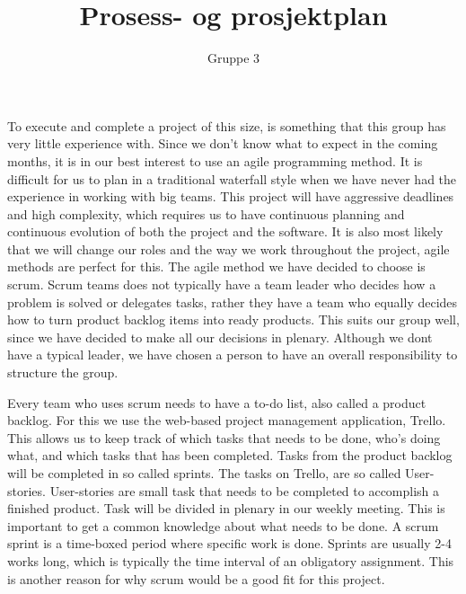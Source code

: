 \documentclass{article}
\begin{document}
\title{Prosess- og prosjektplan}
\author{Gruppe 3}

\maketitle


\raggedright

To execute and complete a project of this size, is something that this group has very little experience with. Since we don't know what to expect in the coming months, it is in our best interest to use an agile programming method. It is difficult for us to plan in a traditional waterfall style when we have never had the experience in working with big teams. This project will have aggressive deadlines and high complexity, which requires us to have continuous planning and continuous evolution of both the project and the software. It is also most likely that we will change our roles and the way we work throughout the project, agile methods are perfect for this. \newline
\newline
The agile method we have decided to choose is scrum. Scrum teams does not typically have a team leader who decides how a problem is solved or delegates tasks, rather they have a team who equally decides how to turn product backlog items into ready products. This suits our group well, since we have decided to make all our decisions in plenary. Although we dont have a typical leader, we have chosen a person to have an overall responsibility to structure the group. \newline

Every team who uses scrum needs to have a to-do list, also called a product backlog. For this we use the web-based project management application, Trello. This allows us to keep track of which tasks that needs to be done, who's doing what, and which tasks that has been completed. Tasks from the product backlog will be completed in so called sprints. The tasks on Trello, are so called User-stories. User-stories are small task that needs to be completed to accomplish a finished product. Task will be divided in plenary in our weekly meeting. This is important  to get a common knowledge about what needs to be done. A scrum sprint is a time-boxed period where specific work is done. Sprints are usually 2-4 works long, which is typically the time interval of an obligatory assignment. This is another reason for why scrum would be a good fit for this project. \newline
\end{document}
